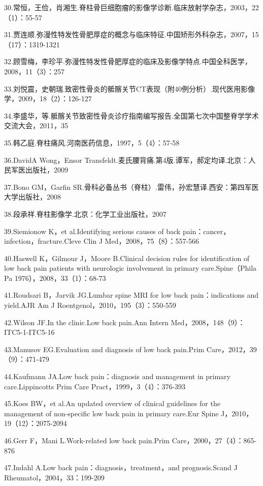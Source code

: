 30.常恒，王俭，肖湘生.脊柱骨巨细胞瘤的影像学诊断.临床放射学杂志，2003，22（1）：55-57

31.贾连顺.弥漫性特发性骨肥厚症的概念与临床特征.中国矫形外科杂志，2007，15（17）：1319-1321

32.顾雪梅，李珍平.弥漫性特发性骨肥厚症的临床及影像学特点.中国全科医学，2008，11（3）：257

33.刘悦震，史朝瑞.致密性骨炎的骶髂关节CT表现（附40例分析）.现代医用影像学，2009，18（2）：126-127

34.李盛华，等.骶髂关节致密性骨炎诊疗指南编写报告.全国第七次中国整脊学学术交流大会，2011，35

35.韩乙庭.脊柱痛风.河南医药信息，1997，5（4）：57-58

36.DavidA Wong，Ensor
Transfeldt.麦氏腰背痛.第4版.谭军，郝定均译.北京：人民军医出版社，2009

37.Bono GM，Garfin
SR.骨科必备丛书（脊柱）.雷伟，孙宏慧译.西安：第四军医大学出版社，2008

38.段承祥.脊柱影像学.北京：化学工业出版社，2007

39.Siemionow K，et al.Identifying serious causes of back
pain：cancer，infection，fracture.Cleve Clin J
Med，2008，75（8）：557-566

40.Haswell K，Gilmour J，Moore B.Clinical decision rules for
identification of low back pain patients with neurologic involvement in
primary care.Spine（Phila Pa 1976），2008，33（1）：68-73

41.Roudsari B，Jarvik JG.Lumbar spine MRI for low back pain：indications
and yield.AJR Am J Roentgenol，2010，195（3）：550-559

42.Wilson JF.In the clinic.Low back pain.Ann Intern
Med，2008，148（9）：ITC5-1-ITC5-16

43.Manusov EG.Evaluation and diagnosis of low back pain.Prim
Care，2012，39（9）：471-479

44.Kaufmann JA.Low back pain：diagnosis and management in primary
care.Lippincotts Prim Care Pract，1999，3（4）：376-393

45.Koes BW，et al.An updated overview of clinical guidelines for the
management of non-specific low back pain in primary care.Eur Spine
J，2010，19（12）：2075-2094

46.Gerr F，Mani L.Work-related low back pain.Prim
Care，2000，27（4）：865-876

47.Indahl A.Low back pain：diagnosis，treatment，and prognosis.Scand J
Rheumatol，2004，33：199-209

\protect\hypertarget{text00338.html}{}{}

